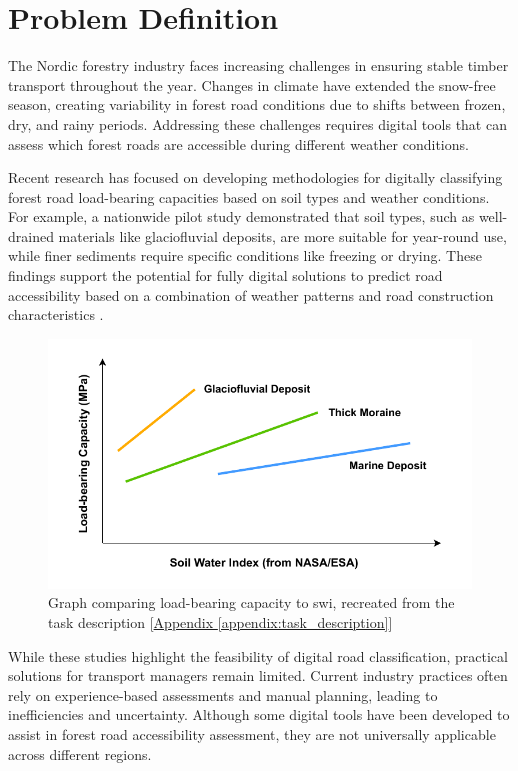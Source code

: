 \section{Problem Definition}
The Nordic forestry industry faces increasing challenges in ensuring stable timber transport throughout the year. Changes in climate have extended the snow-free season, creating variability in forest road conditions due to shifts between frozen, dry, and rainy periods. Addressing these challenges requires digital tools that can assess which forest roads are accessible during different weather conditions.

Recent research has focused on developing methodologies for digitally classifying forest road load-bearing capacities based on soil types and weather conditions. For example, a nationwide pilot study demonstrated that soil types, such as well-drained materials like \gls{glaciofluvial deposit}s, are more suitable for year-round use, while finer sediments require specific conditions like freezing or drying. These findings support the potential for fully digital solutions to predict road accessibility based on a combination of weather patterns and road construction characteristics \cite{fjeld2023trafficability}.

\begin{figure}[h]
    \centering
    \includegraphics[width=0.7\linewidth]{figures/bæreevne_tørkeindex.pdf}
    \caption[Graph comparing load-bearing capacity to \acrshort{swi}]{Graph comparing load-bearing capacity to \acrshort{swi}, recreated from the task description [\hyperref[appendix:task_description]{Appendix \ref*{appendix:task_description}}]}
    \label{fig:load_to_swi_graph}
\end{figure}

While these studies highlight the feasibility of digital road classification, practical solutions for transport managers remain limited. Current industry practices often rely on experience-based assessments and manual planning, leading to inefficiencies and uncertainty. Although some digital tools have been developed to assist in forest road accessibility assessment, they are not universally applicable across different regions.


